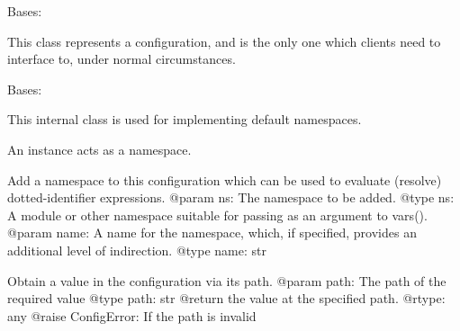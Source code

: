 \documentclass[a4paper,10pt,english]{sphinxmanual}
\begin{document}
\begin{fulllineitems}
\label{commands/apidoc/src:src.pyconf.Config}
Bases: {\hyperref[commands/apidoc/src:src.pyconf.Mapping]{}}

This class represents a configuration, and is the only one which clients
need to interface to, under normal circumstances.

\begin{fulllineitems}
\label{commands/apidoc/src:src.pyconf.Config.Namespace}
Bases: 

This internal class is used for implementing default namespaces.

An instance acts as a namespace.

\end{fulllineitems}


\begin{fulllineitems}
\label{commands/apidoc/src:src.pyconf.Config.addNamespace}
Add a namespace to this configuration which can be used to evaluate
(resolve) dotted-identifier expressions.
@param ns: The namespace to be added.
@type ns: A module or other namespace suitable for passing as an
argument to vars().
@param name: A name for the namespace, which, if specified, provides
an additional level of indirection.
@type name: str

\end{fulllineitems}


\begin{fulllineitems}
\label{commands/apidoc/src:src.pyconf.Config.getByPath}
Obtain a value in the configuration via its path.
@param path: The path of the required value
@type path: str
@return the value at the specified path.
@rtype: any
@raise ConfigError: If the path is invalid

\end{fulllineitems}



\end{fulllineitems}
\end{document}
